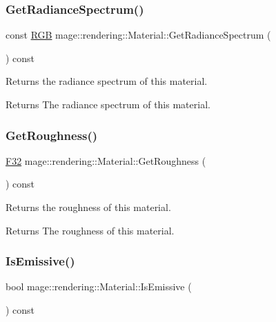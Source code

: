 \subsubsection{\texorpdfstring{Get\+Radiance\+Spectrum()}{GetRadianceSpectrum()}}
{\footnotesize\ttfamily const \mbox{\hyperlink{structmage_1_1_r_g_b}{R\+GB}} mage\+::rendering\+::\+Material\+::\+Get\+Radiance\+Spectrum (\begin{DoxyParamCaption}{ }\end{DoxyParamCaption}) const\hspace{0.3cm}{\ttfamily [noexcept]}}

Returns the radiance spectrum of this material.

\begin{DoxyReturn}{Returns}
The radiance spectrum of this material. 
\end{DoxyReturn}
\mbox{\label{classmage_1_1rendering_1_1_material_a4c950a1b95e14246027de8ff0da4d55a}} 
\subsubsection{\texorpdfstring{Get\+Roughness()}{GetRoughness()}}
{\footnotesize\ttfamily \mbox{\hyperlink{namespacemage_aa97e833b45f06d60a0a9c4fc22ae02c0}{F32}} mage\+::rendering\+::\+Material\+::\+Get\+Roughness (\begin{DoxyParamCaption}{ }\end{DoxyParamCaption}) const\hspace{0.3cm}{\ttfamily [noexcept]}}

Returns the roughness of this material.

\begin{DoxyReturn}{Returns}
The roughness of this material. 
\end{DoxyReturn}
\mbox{\label{classmage_1_1rendering_1_1_material_acf52f6bc5f849928751e10157bdb3c3c}} 
\subsubsection{\texorpdfstring{Is\+Emissive()}{IsEmissive()}}
{\footnotesize\ttfamily bool mage\+::rendering\+::\+Material\+::\+Is\+Emissive (\begin{DoxyParamCaption}{ }\end{DoxyParamCaption}) const\hspace{0.3cm}{\ttfamily [noexcept]}}

